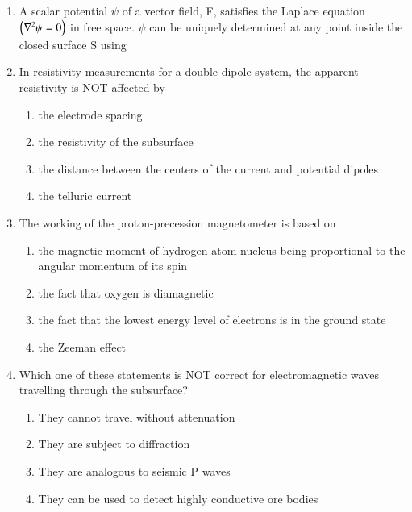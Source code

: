 \documentclass[journal,12pt,onecolumn]{IEEEtran}
\theoremstyle{remark}
\begin{document}
\begin{enumerate}
\item A scalar potential $\psi$ of a vector field, F, satisfies the Laplace equation $\left(\nabla^2 \psi = 0\right)$ in free space. $\psi$ can be uniquely determined at any point inside the closed surface S using  \hfill{}
\begin{enumerate}
\end{enumerate}

\item In resistivity measurements for a double-dipole system, the apparent resistivity is NOT affected by \hfill{}
\begin{enumerate}
    \item the electrode spacing
    \item the resistivity of the subsurface
    \item the distance between the centers of the current and potential dipoles
    \item the telluric current
\end{enumerate}

\item The working of the proton-precession magnetometer is based on \hfill{}
\begin{enumerate}
    \item the magnetic moment of hydrogen-atom nucleus being proportional to the angular momentum of its spin
    \item the fact that oxygen is diamagnetic
    \item the fact that the lowest energy level of electrons is in the ground state
    \item the Zeeman effect
\end{enumerate}

\item Which one of these statements is NOT correct for electromagnetic waves travelling through the subsurface? \hfill{}
\begin{enumerate}
    \item They cannot travel without attenuation
    \item They are subject to diffraction
    \item They are analogous to seismic P waves
    \item They can be used to detect highly conductive ore bodies
\end{enumerate}


\end{enumerate}
\end{document}
